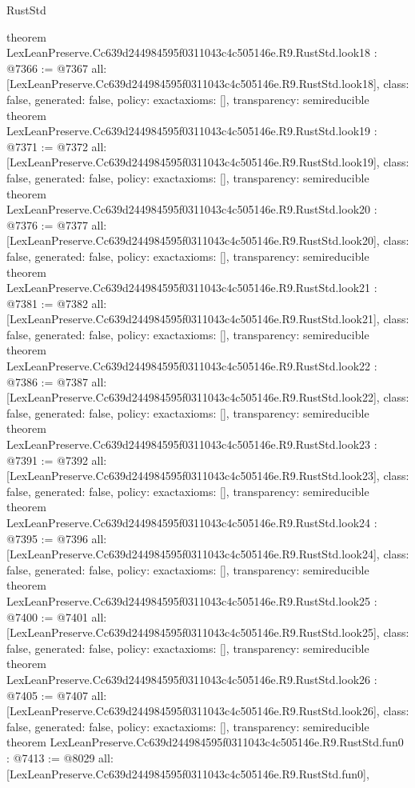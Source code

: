 \begin{lexlean}{RustStd}
\begin{coremodule}
{}
theorem LexLeanPreserve.Cc639d244984595f0311043c4c505146e.R9.RustStd.look18 : @7366 := @7367 {
  all: [LexLeanPreserve.Cc639d244984595f0311043c4c505146e.R9.RustStd.look18],
  class: false,
  generated: false,
  policy: exact{axioms: []},
  transparency: semireducible
}
theorem LexLeanPreserve.Cc639d244984595f0311043c4c505146e.R9.RustStd.look19 : @7371 := @7372 {
  all: [LexLeanPreserve.Cc639d244984595f0311043c4c505146e.R9.RustStd.look19],
  class: false,
  generated: false,
  policy: exact{axioms: []},
  transparency: semireducible
}
theorem LexLeanPreserve.Cc639d244984595f0311043c4c505146e.R9.RustStd.look20 : @7376 := @7377 {
  all: [LexLeanPreserve.Cc639d244984595f0311043c4c505146e.R9.RustStd.look20],
  class: false,
  generated: false,
  policy: exact{axioms: []},
  transparency: semireducible
}
theorem LexLeanPreserve.Cc639d244984595f0311043c4c505146e.R9.RustStd.look21 : @7381 := @7382 {
  all: [LexLeanPreserve.Cc639d244984595f0311043c4c505146e.R9.RustStd.look21],
  class: false,
  generated: false,
  policy: exact{axioms: []},
  transparency: semireducible
}
theorem LexLeanPreserve.Cc639d244984595f0311043c4c505146e.R9.RustStd.look22 : @7386 := @7387 {
  all: [LexLeanPreserve.Cc639d244984595f0311043c4c505146e.R9.RustStd.look22],
  class: false,
  generated: false,
  policy: exact{axioms: []},
  transparency: semireducible
}
theorem LexLeanPreserve.Cc639d244984595f0311043c4c505146e.R9.RustStd.look23 : @7391 := @7392 {
  all: [LexLeanPreserve.Cc639d244984595f0311043c4c505146e.R9.RustStd.look23],
  class: false,
  generated: false,
  policy: exact{axioms: []},
  transparency: semireducible
}
theorem LexLeanPreserve.Cc639d244984595f0311043c4c505146e.R9.RustStd.look24 : @7395 := @7396 {
  all: [LexLeanPreserve.Cc639d244984595f0311043c4c505146e.R9.RustStd.look24],
  class: false,
  generated: false,
  policy: exact{axioms: []},
  transparency: semireducible
}
theorem LexLeanPreserve.Cc639d244984595f0311043c4c505146e.R9.RustStd.look25 : @7400 := @7401 {
  all: [LexLeanPreserve.Cc639d244984595f0311043c4c505146e.R9.RustStd.look25],
  class: false,
  generated: false,
  policy: exact{axioms: []},
  transparency: semireducible
}
theorem LexLeanPreserve.Cc639d244984595f0311043c4c505146e.R9.RustStd.look26 : @7405 := @7407 {
  all: [LexLeanPreserve.Cc639d244984595f0311043c4c505146e.R9.RustStd.look26],
  class: false,
  generated: false,
  policy: exact{axioms: []},
  transparency: semireducible
}
theorem LexLeanPreserve.Cc639d244984595f0311043c4c505146e.R9.RustStd.fun0 : @7413 := @8029 {
  all: [LexLeanPreserve.Cc639d244984595f0311043c4c505146e.R9.RustStd.fun0],
}
\end{coremodule}
\end{lexlean}

